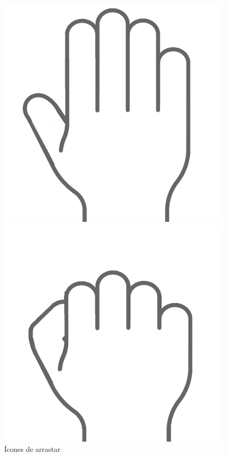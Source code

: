 \begin{figure}[H]
    \centering
    \begin{minipage}{.4\textwidth}
      \centering
      \includegraphics[scale=0.1]{../figuras/open_hand_icon.png}
    \end{minipage}%
    \begin{minipage}{.4\textwidth}
      \centering
      \includegraphics[scale=0.1]{../figuras/closed_hand_icon.png}
    \end{minipage}
    \caption{Ícones de arrastar}
\end{figure}


